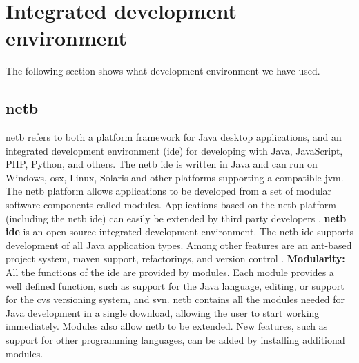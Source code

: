 \section{Integrated development environment}

The following section shows what development environment we have used.

\subsection{\gls{netb}}
\gls{netb} refers to both a platform framework for Java desktop applications, and an integrated development environment (\gls{ide}) for developing with Java, JavaScript, PHP, Python, and others.
The \gls{netb} \gls{ide} is written in Java and can run on Windows, \gls{osx}, Linux, Solaris and other platforms supporting a compatible \gls{jvm}. 
\newline
\newline
The \gls{netb} platform allows applications to be developed from a set of modular software components called modules. Applications based on the \gls{netb} platform (including the \gls{netb} \gls{ide}) can easily be extended by third party developers \cite{bib:netbeans}.
\newline
\newline
\textbf{\gls{netb} \gls{ide}} is an open-source integrated development environment. The \gls{netb} \gls{ide} supports development of all Java application types. Among other features are an \gls{ant}-based project system, \gls{maven} support, refactorings, and version control \cite{bib:ide}.
\newline
\newline
\textbf{Modularity:} All the functions of the \gls{ide} are provided by modules. Each module provides a well defined function, such as support for the Java language, editing, or support for the \gls{cvs} versioning system, and \gls{svn}. \gls{netb} contains all the modules needed for Java development in a single download, allowing the user to start working immediately. Modules also allow \gls{netb} to be extended. New features, such as support for other programming languages, can be added by installing additional modules.